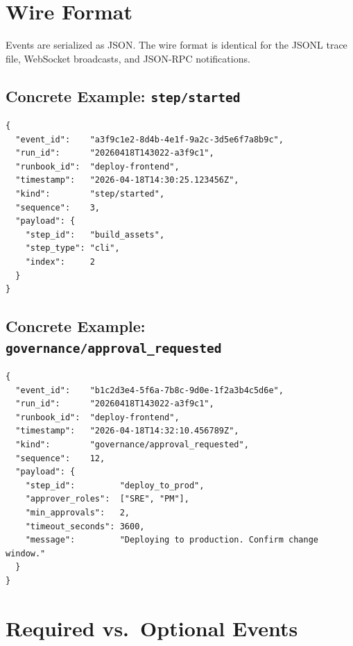 \section{Wire Format}

Events are serialized as JSON. The wire format is identical for the JSONL trace file, WebSocket broadcasts, and JSON-RPC notifications.

\subsection{Concrete Example: \texttt{step/started}}

\begin{verbatim}
{
  "event_id":    "a3f9c1e2-8d4b-4e1f-9a2c-3d5e6f7a8b9c",
  "run_id":      "20260418T143022-a3f9c1",
  "runbook_id":  "deploy-frontend",
  "timestamp":   "2026-04-18T14:30:25.123456Z",
  "kind":        "step/started",
  "sequence":    3,
  "payload": {
    "step_id":   "build_assets",
    "step_type": "cli",
    "index":     2
  }
}
\end{verbatim}

\subsection{Concrete Example: \texttt{governance/approval\_requested}}

\begin{verbatim}
{
  "event_id":    "b1c2d3e4-5f6a-7b8c-9d0e-1f2a3b4c5d6e",
  "run_id":      "20260418T143022-a3f9c1",
  "runbook_id":  "deploy-frontend",
  "timestamp":   "2026-04-18T14:32:10.456789Z",
  "kind":        "governance/approval_requested",
  "sequence":    12,
  "payload": {
    "step_id":         "deploy_to_prod",
    "approver_roles":  ["SRE", "PM"],
    "min_approvals":   2,
    "timeout_seconds": 3600,
    "message":         "Deploying to production. Confirm change window."
  }
}
\end{verbatim}

\section{Required vs.\ Optional Events}

